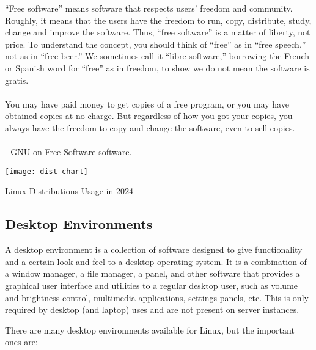 \begin{itemize}
{      “Free software” means software that respects users' freedom and community. Roughly, it means that the users have the freedom to run, copy, distribute, study, change and improve the software. Thus, “free software” is a matter of liberty, not price. To understand the concept, you should think of “free” as in “free speech,” not as in “free beer.” We sometimes call it “libre software,” borrowing the French or Spanish word for “free” as in freedom, to show we do not mean the software is gratis. \\\\ You may have paid money to get copies of a free program, or you may have obtained copies at no charge. But regardless of how you got your copies, you always have the freedom to copy and change the software, even to sell copies. \\\\ - \href{https://www.gnu.org/philosophy/free-sw.en.html}{GNU on Free Software}
    } software.
\end{itemize}

\begin{marginfigure}
	\texttt{[image: dist-chart]}
	\caption[Linux Distributions Usage]{Linux Distributions Usage in 2024}
\end{marginfigure}

\subsection{Desktop Environments}
\begin{definition}
  A desktop environment is a collection of software designed to give functionality and a certain look and feel to a desktop operating system. It is a combination of a window manager, a file manager, a panel, and other software that provides a graphical user interface and utilities to a regular desktop user, such as volume and brightness control, multimedia applications, settings panels, etc. This is only required by desktop (and laptop) uses and are not present on server instances.
\end{definition}

There are many desktop environments available for Linux, but the important ones are:

